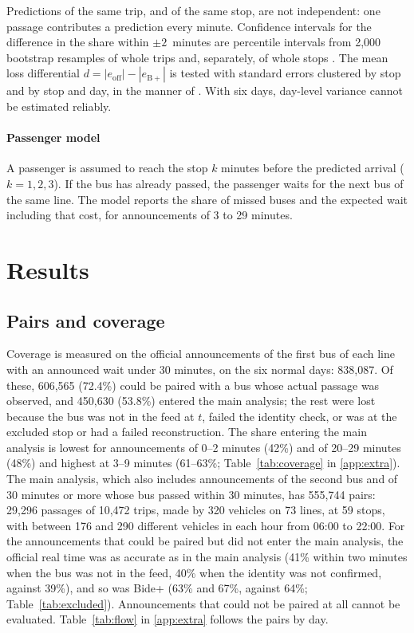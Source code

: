 Predictions of the same trip, and of the same stop, are not independent: one passage contributes a prediction every
minute. Confidence intervals for the difference in the share within $\pm2$~minutes are percentile intervals from 2,000
bootstrap resamples of whole trips and, separately, of whole stops \parencite{efron1993bootstrap}. The mean loss
differential $d = |e_{\mathrm{off}}| - |e_{\mathrm{B+}}|$ is tested with standard errors clustered by stop and by stop and
day, in the manner of \textcite{diebold1995comparing}. With six days, day-level variance cannot be estimated reliably.

\paragraph{Passenger model} A passenger is assumed to reach the stop $k$ minutes before the predicted arrival
($k = 1, 2, 3$). If the bus has already passed, the passenger waits for the next bus of the same line. The model reports
the share of missed buses and the expected wait including that cost, for announcements of 3 to 29 minutes.

\section{Results}
\label{sec:results}

\subsection{Pairs and coverage}

Coverage is measured on the official announcements of the first bus of each line with an announced wait under 30
minutes, on the six normal days: 838,087. Of these, 606,565 (72.4\%) could be paired with a bus whose actual passage
was observed, and 450,630 (53.8\%) entered the main analysis; the rest were lost because the bus was not in the feed at
$t$, failed the identity check, or was at the excluded stop or had a failed reconstruction. The share entering the main analysis is lowest for announcements of 0--2 minutes
(42\%) and of 20--29 minutes (48\%) and highest at 3--9 minutes (61--63\%; Table~\ref{tab:coverage} in
\ref{app:extra}). The main analysis, which also includes announcements of the second bus and of 30 minutes or more whose
bus passed within 30 minutes, has 555,744 pairs: 29,296 passages of 10,472 trips, made by 320 vehicles on 73 lines, at
59 stops, with between 176 and 290 different vehicles in each hour from 06:00 to 22:00. For the announcements that could
be paired but did not enter the main analysis, the official real time was as accurate as in the main analysis (41\% within
two minutes when the bus was not in the feed, 40\% when the identity was not confirmed, against 39\%), and so was Bide+
(63\% and 67\%, against 64\%; Table~\ref{tab:excluded}). Announcements that could not be paired at all cannot be
evaluated. Table~\ref{tab:flow} in
\ref{app:extra} follows the pairs by day.

